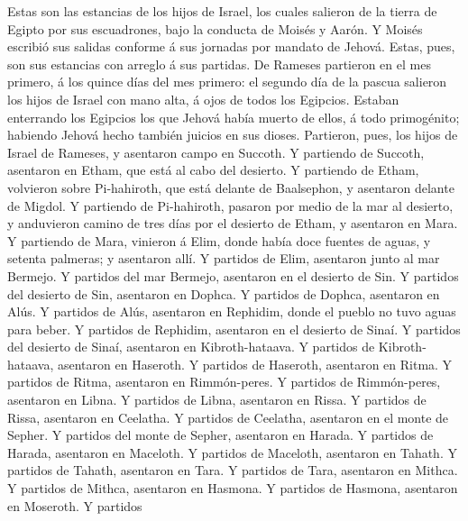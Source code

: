  Estas son las estancias de los hijos de Israel, los cuales
salieron de la tierra de Egipto por sus escuadrones, bajo la conducta de
Moisés y Aarón.  Y Moisés escribió sus salidas conforme á
sus jornadas por mandato de Jehová. Estas, pues, son sus estancias con
arreglo á sus partidas.  De Rameses partieron en el mes
primero, á los quince días del mes primero: el segundo día de la pascua
salieron los hijos de Israel con mano alta, á ojos de todos los
Egipcios.  Estaban enterrando los Egipcios los que Jehová
había muerto de ellos, á todo primogénito; habiendo Jehová hecho también
juicios en sus dioses.  Partieron, pues, los hijos de Israel
de Rameses, y asentaron campo en Succoth.  Y partiendo de
Succoth, asentaron en Etham, que está al cabo del desierto. 
Y partiendo de Etham, volvieron sobre Pi-hahiroth, que está delante de
Baalsephon, y asentaron delante de Migdol.  Y partiendo de
Pi-hahiroth, pasaron por medio de la mar al desierto, y anduvieron
camino de tres días por el desierto de Etham, y asentaron en Mara.
 Y partiendo de Mara, vinieron á Elim, donde había doce
fuentes de aguas, y setenta palmeras; y asentaron allí.  Y
partidos de Elim, asentaron junto al mar Bermejo.  Y
partidos del mar Bermejo, asentaron en el desierto de Sin. 
Y partidos del desierto de Sin, asentaron en Dophca.  Y
partidos de Dophca, asentaron en Alús.  Y partidos de Alús,
asentaron en Rephidim, donde el pueblo no tuvo aguas para beber.
 Y partidos de Rephidim, asentaron en el desierto de Sinaí.
 Y partidos del desierto de Sinaí, asentaron en
Kibroth-hataava.  Y partidos de Kibroth-hataava, asentaron
en Haseroth.  Y partidos de Haseroth, asentaron en Ritma.
 Y partidos de Ritma, asentaron en Rimmón-peres.
 Y partidos de Rimmón-peres, asentaron en Libna.
 Y partidos de Libna, asentaron en Rissa.  Y
partidos de Rissa, asentaron en Ceelatha.  Y partidos de
Ceelatha, asentaron en el monte de Sepher.  Y partidos del
monte de Sepher, asentaron en Harada.  Y partidos de
Harada, asentaron en Maceloth.  Y partidos de Maceloth,
asentaron en Tahath.  Y partidos de Tahath, asentaron en
Tara.  Y partidos de Tara, asentaron en Mithca.
 Y partidos de Mithca, asentaron en Hasmona. 
Y partidos de Hasmona, asentaron en Moseroth.  Y partidos
